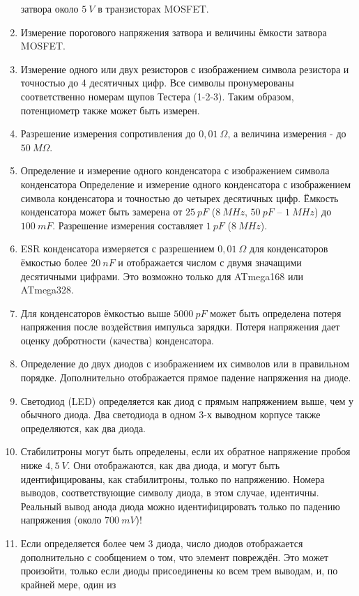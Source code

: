 \begin{enumerate}
затвора около \(5~V\) в транзисторах MOSFET.
\item Измерение порогового напряжения затвора и величины ёмкости затвора MOSFET. 
\item Измерение одного или двух резисторов с изображением  \mbox{\electricR}
символа резистора и точностью до 4 десятичных цифр. Все символы пронумерованы соответственно номерам 
щупов Тестера (1-2-3). Таким образом, потенциометр также может быть измерен. 
\item Разрешение измерения сопротивления до  \(0,01~\Omega\), а величина измерения - до  \(50~M\Omega\).
\item Определение и измерение одного конденсатора с изображением символа конденсатора  \mbox{\electricC}
Определение и измерение одного конденсатора с изображением символа конденсатора и точностью до четырех десятичных цифр. 
Ёмкость конденсатора может быть замерена от \(25~pF\) (\(8~MHz\), \(50~pF\) – \(1~MHz\)) до \(100~mF\). 
Разрешение измерения составляет \(1~pF\) (\(8~MHz\)).
\item ESR конденсатора измеряется с разрешением \(0,01~\Omega\) для конденсаторов ёмкостью более \(20~nF\) 
и отображается числом с двумя значащими десятичными цифрами. Это возможно только для ATmega168 или ATmega328.
\item Для конденсаторов ёмкостью выше \(5000~pF\) может быть определена потеря напряжения после воздействия импульса 
зарядки. Потеря напряжения дает оценку добротности (качества) конденсатора.
\item Определение до двух диодов с изображением их символов \mbox{\electricDAK} или \mbox{\electricDKA}
в правильном порядке. 
Дополнительно отображается прямое падение напряжения на диоде.
\item Светодиод (LED) определяется как диод с прямым напряжением выше, чем у обычного диода. Два светодиода 
в одном 3-х выводном корпусе также определяются, как два диода.
\item Стабилитроны могут быть определены, если их обратное напряжение пробоя ниже \(4,5~V\). Они отображаются, 
как два диода, и могут быть идентифицированы, как стабилитроны, только по напряжению. Номера выводов, соответствующие 
символу диода, в этом случае, идентичны. Реальный вывод анода диода можно идентифицировать только по падению напряжения 
(около \(700~mV\))!
\item Если определяется более чем 3 диода, число диодов отображается дополнительно с сообщением о том, что элемент 
повреждён. Это может произойти, только если диоды присоединены ко всем трем выводам, и, по крайней мере, один из 

\end{enumerate}

